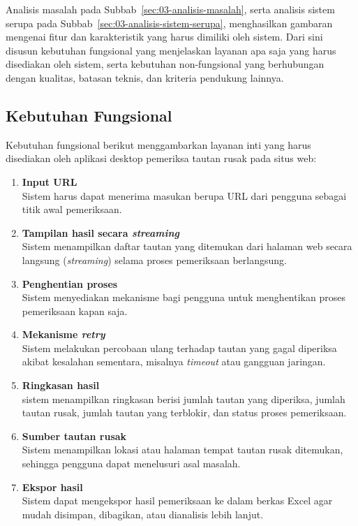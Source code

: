 


Analisis masalah pada Subbab~\ref{sec:03-analisis-masalah}, serta analisis sistem serupa pada Subbab~\ref{sec:03-analisis-sistem-serupa}, menghasilkan gambaran mengenai fitur dan karakteristik yang harus dimiliki oleh sistem. Dari sini disusun kebutuhan fungsional yang menjelaskan layanan apa saja yang harus disediakan oleh sistem, serta kebutuhan non-fungsional yang berhubungan dengan kualitas, batasan teknis, dan kriteria pendukung lainnya.


\subsection{Kebutuhan Fungsional}
\label{subsec:0303-kebutuhan-fungsional}

Kebutuhan fungsional berikut menggambarkan layanan inti yang harus disediakan oleh aplikasi desktop pemeriksa tautan rusak pada situs web:

\begin{enumerate}
    \item \textbf{Input URL}\\
    Sistem harus dapat menerima masukan berupa URL dari pengguna sebagai titik awal pemeriksaan.

    \item \textbf{Tampilan hasil secara \textit{streaming}}\\
    Sistem menampilkan daftar tautan yang ditemukan dari halaman web secara langsung (\textit{streaming}) selama proses pemeriksaan berlangsung.

    \item \textbf{Penghentian proses}\\
    Sistem menyediakan mekanisme bagi pengguna untuk menghentikan proses pemeriksaan kapan saja.

    \item \textbf{Mekanisme \textit{retry}}\\
    Sistem melakukan percobaan ulang terhadap tautan yang gagal diperiksa akibat kesalahan sementara, misalnya \textit{timeout} atau gangguan jaringan.

    \item \textbf{Ringkasan hasil}\\
    sistem menampilkan ringkasan berisi jumlah tautan yang diperiksa, jumlah tautan rusak, jumlah tautan yang terblokir, dan status proses pemeriksaan.


    \item \textbf{Sumber tautan rusak}\\
    Sistem menampilkan lokasi atau halaman tempat tautan rusak ditemukan, sehingga pengguna dapat menelusuri asal masalah.

    \item \textbf{Ekspor hasil}\\
    Sistem dapat mengekspor hasil pemeriksaan ke dalam berkas Excel agar mudah disimpan, dibagikan, atau dianalisis lebih lanjut.
\end{enumerate}


